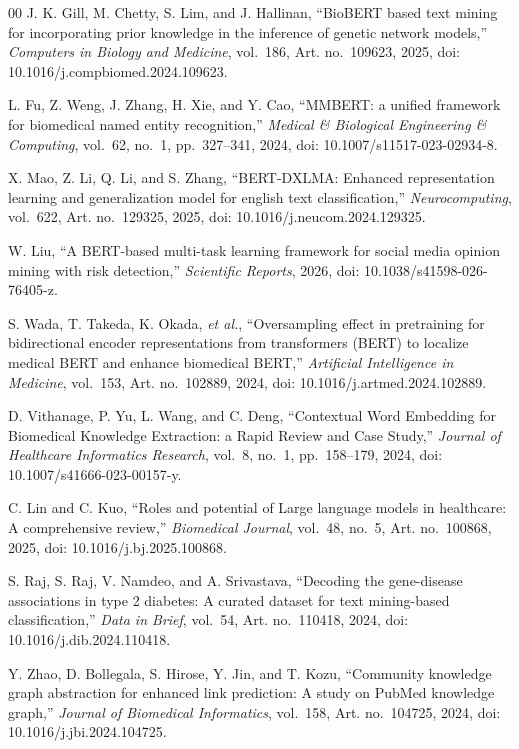 \documentclass[a4paper,fleqn]{cas-dc}
\begin{document}
\begin{thebibliography}{00}
\setlength{\itemsep}{1.0pt plus 0.5pt minus 0.5pt}
 J. K. Gill, M. Chetty, S. Lim, and J. Hallinan, ``BioBERT based text mining for incorporating prior knowledge in the inference of genetic network models,'' \textit{Computers in Biology and Medicine}, vol.~186, Art. no.~109623, 2025, doi: 10.1016/j.compbiomed.2024.109623.

 L. Fu, Z. Weng, J. Zhang, H. Xie, and Y. Cao, ``MMBERT: a unified framework for biomedical named entity recognition,'' \textit{Medical \& Biological Engineering \& Computing}, vol.~62, no.~1, pp.~327--341, 2024, doi: 10.1007/s11517-023-02934-8.

 X. Mao, Z. Li, Q. Li, and S. Zhang, ``BERT-DXLMA: Enhanced representation learning and generalization model for english text classification,'' \textit{Neurocomputing}, vol.~622, Art. no.~129325, 2025, doi: 10.1016/j.neucom.2024.129325.

 W. Liu, ``A BERT-based multi-task learning framework for social media opinion mining with risk detection,'' \textit{Scientific Reports}, 2026, doi: 10.1038/s41598-026-76405-z.

 S. Wada, T. Takeda, K. Okada, \textit{et al.}, ``Oversampling effect in pretraining for bidirectional encoder representations from transformers (BERT) to localize medical BERT and enhance biomedical BERT,'' \textit{Artificial Intelligence in Medicine}, vol.~153, Art. no.~102889, 2024, doi: 10.1016/j.artmed.2024.102889.

 D. Vithanage, P. Yu, L. Wang, and C. Deng, ``Contextual Word Embedding for Biomedical Knowledge Extraction: a Rapid Review and Case Study,'' \textit{Journal of Healthcare Informatics Research}, vol.~8, no.~1, pp.~158--179, 2024, doi: 10.1007/s41666-023-00157-y.

 C. Lin and C. Kuo, ``Roles and potential of Large language models in healthcare: A comprehensive review,'' \textit{Biomedical Journal}, vol.~48, no.~5, Art. no.~100868, 2025, doi: 10.1016/j.bj.2025.100868.

 S. Raj, S. Raj, V. Namdeo, and A. Srivastava, ``Decoding the gene-disease associations in type 2 diabetes: A curated dataset for text mining-based classification,'' \textit{Data in Brief}, vol.~54, Art. no.~110418, 2024, doi: 10.1016/j.dib.2024.110418.

 Y. Zhao, D. Bollegala, S. Hirose, Y. Jin, and T. Kozu, ``Community knowledge graph abstraction for enhanced link prediction: A study on PubMed knowledge graph,'' \textit{Journal of Biomedical Informatics}, vol.~158, Art. no.~104725, 2024, doi: 10.1016/j.jbi.2024.104725.


\end{thebibliography}
\end{document}
